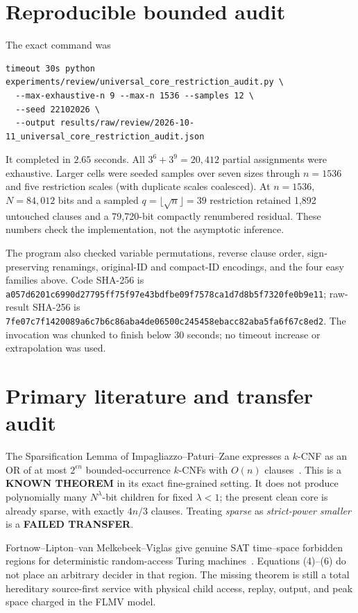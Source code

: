 \documentclass[11pt]{article}
\begin{document}
\section{Reproducible bounded audit}
The exact command was
\begin{verbatim}
timeout 30s python experiments/review/universal_core_restriction_audit.py \
  --max-exhaustive-n 9 --max-n 1536 --samples 12 \
  --seed 22102026 \
  --output results/raw/review/2026-10-11_universal_core_restriction_audit.json
\end{verbatim}
It completed in $2.65$ seconds.  All $3^6+3^9=20{,}412$ partial
assignments were exhaustive.  Larger cells were seeded samples over seven
sizes through $n=1536$ and five restriction scales (with duplicate scales
coalesced).  At $n=1536$, $N=84{,}012$ bits and a sampled
$q=\lfloor\sqrt n\rfloor=39$ restriction retained 1,892 untouched
clauses and a 79,720-bit compactly renumbered residual.  These numbers check
the implementation, not the asymptotic inference.

The program also checked variable permutations, reverse clause order,
sign-preserving renamings, original-ID and compact-ID encodings, and the four
easy families above.  Code SHA-256 is
\nolinkurl{a057d6201c6990d27795ff75f97e43bdfbe09f7578ca1d7d8b5f7320fe0b9e11};
raw-result SHA-256 is
\nolinkurl{7fe07c7f1420089a6c7b6c86aba4de06500c245458ebacc82aba5fa6f67c8ed2}.
The invocation was chunked to finish below 30 seconds; no timeout increase
or extrapolation was used.

\section{Primary literature and transfer audit}
The Sparsification Lemma of Impagliazzo--Paturi--Zane expresses a $k$-CNF as
an OR of at most $2^{\epsilon n}$ bounded-occurrence $k$-CNFs with $O(n)$
clauses~\cite{ipz}.  This is a \textbf{KNOWN THEOREM} in its exact
fine-grained setting.  It does not produce polynomially many
$N^\lambda$-bit children for fixed $\lambda<1$; the present clean core is
already sparse, with exactly $4n/3$ clauses.  Treating \emph{sparse} as
\emph{strict-power smaller} is a \textbf{FAILED TRANSFER}.

Fortnow--Lipton--van Melkebeek--Viglas give genuine SAT time--space forbidden
regions for deterministic random-access Turing machines~\cite{flmv}.
Equations (4)--(6) do not place an arbitrary decider in that region.  The
missing theorem is still a total hereditary source-first service with
physical child access, replay, output, and peak space charged in the FLMV
model.
\end{document}
